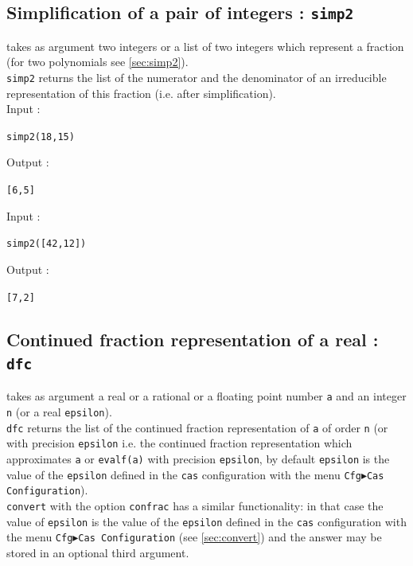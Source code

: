 \documentclass[a4paper,11pt]{book}
\begin{document}
\subsection{Simplification of a pair of integers : {\tt simp2}}\label{sec:isimp2}
 takes as argument two integers or a list of two integers 
 which represent a fraction (for two polynomials see \ref{sec:simp2}).\\
{\tt simp2} returns the list of the numerator and the denominator of 
an irreducible representation of this fraction 
(i.e. after simplification).\\
Input :
\begin{center}{\tt simp2(18,15) }\end{center}
Output :
\begin{center}{\tt [6,5]}\end{center} 
Input :
\begin{center}{\tt  simp2([42,12])}\end{center}
Output :
\begin{center}{\tt [7,2]}\end{center}

\subsection{Continued fraction representation of a real : {\tt dfc}}\label{sec:convertdfc}
 takes as argument a real or a rational or a
floating point number {\tt a} and an integer {\tt n} 
(or a real {\tt epsilon}).\\
{\tt dfc} returns the list of the continued fraction representation 
of {\tt a} of order {\tt n} (or with precision {\tt epsilon} i.e. 
the continued fraction representation which 
approximates {\tt a} or {\tt evalf(a)} with precision 
{\tt epsilon}, by default {\tt epsilon} is the value of the {\tt epsilon} 
defined in the {\tt cas} configuration with the menu 
{\tt Cfg$\blacktriangleright$Cas Configuration}).\\ 
{\tt convert} with the option {\tt confrac} has a similar
functionality: in that case
the value of {\tt epsilon} is the value of the {\tt epsilon} 
defined in the {\tt cas} configuration with the menu 
{\tt Cfg$\blacktriangleright$Cas Configuration} (see
\ref{sec:convert})
and the answer may be stored in an optional third argument.
 
\end{document}

